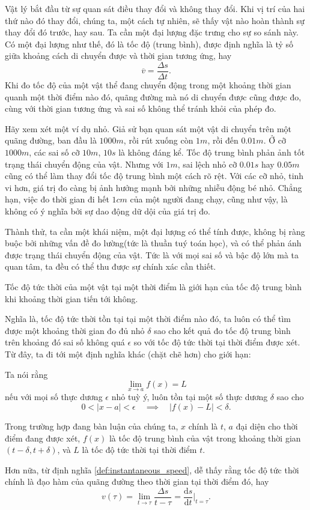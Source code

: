 Vật lý bắt đầu từ sự quan sát điều thay đổi và không thay đổi. Khi vị trí của hai thứ nào đó thay đổi, chúng ta, một cách tự nhiên, sẽ thấy vật nào hoàn thành sự thay đổi đó trước, hay sau. Ta cần một đại lượng đặc trưng cho sự so sánh này. Có một đại lượng như thế, đó là tốc độ (trung bình), được định nghĩa là tỷ số giữa khoảng cách di chuyển được và thời gian tương ứng, hay
\[\overline{v}=\frac{\Delta s}{\Delta t}.\] 
Khi đo tốc độ của một vật thể đang chuyển động trong một khoảng thời gian quanh một thời điểm nào đó, quãng đường mà nó di chuyển được cũng được đo, cùng với thời gian tương ứng và sai số không thể tránh khỏi của phép đo.
\vspace{8pt}

Hãy xem xét một ví dụ nhỏ. Giả sử bạn quan sát một vật di chuyển trên một quãng đường, ban đầu là \(1000m\), rồi rút xuống còn \(1m\), rồi đến \(0.01m\). Ở cỡ \(1000m\), các sai số cỡ \(10m\), \(10s\) là không đáng kể. Tốc độ trung bình phản ảnh tốt trạng thái chuyển động của vật. Nhưng với \(1m\), sai lệch nhỏ cỡ \(0.01s\) hay \(0.05m\) cũng có thể làm thay đổi tốc độ trung bình một cách rõ rệt. Với các cỡ nhỏ, tinh vi hơn, giá trị đo càng bị ảnh hưởng mạnh bởi những nhiễu động bé nhỏ.
Chẳng hạn, việc đo thời gian đi hết \(1cm\) của một người đang chạy, cũng như vậy, là không có ý nghĩa bởi sự dao động dữ dội của giá trị đo.  
\vspace{8pt}

Thành thử, ta cần một khái niệm, một đại lượng có thể tính được, không bị ràng buộc bởi những vấn đề đo lường(tức là thuần tuý toán học), và có thể phản ánh được trạng thái chuyển động của vật. Tức là với mọi sai số và bậc độ lớn mà ta quan tâm, ta đều có thể thu được sự chính xác cần thiết. 
\begin{definition}\label{def:instantaneous_speed}
    Tốc độ tức thời của một vật tại một thời điểm là giới hạn của tốc độ trung bình khi khoảng thời gian tiến tới không.
\end{definition}
Nghĩa là, tốc độ tức thời tồn tại tại một thời điểm nào đó, ta luôn có thể tìm được một khoảng thời gian đo đủ nhỏ \(\delta\) sao cho kết quả đo tốc độ trung bình trên khoảng đó sai số không quá \(\epsilon\) so với tốc độ tức thời tại thời điểm được xét. Từ đây, ta đi tới một định nghĩa khác (chặt chẽ hơn) cho giới hạn:
\begin{definition}
    Ta nói rằng \[\lim_{x\rightarrow a}f(x)=L\] nếu với mọi số thực dương \(\epsilon\) nhỏ tuỳ ý, luôn tồn tại một số thực dương \(\delta\) sao cho 
    \[0<\lvert x-a\rvert <\epsilon \quad\implies \quad \lvert f(x)-L\rvert <\delta.\]
\end{definition}
Trong trường hợp đang bàn luận của chúng ta, \(x\) chính là \(t\), \(a\) đại diện cho thời điểm đang được xét, \(f(x)\) là tốc độ trung bình của vật trong khoảng thời gian \((t-\delta,t+\delta)\), và \(L\) là tốc độ tức thời tại thời điểm \(t\).
\vspace{8pt}

Hơn nữa, từ định nghĩa \ref{def:instantaneous_speed}, dễ thấy rằng tốc độ tức thời chính là đạo hàm của quãng đường theo thời gian tại thời điểm đó, hay 
\[v(\tau)=\lim_{t\rightarrow\tau}\frac{\Delta s}{t-\tau}=\frac{\text{d}s}{\text{d}t}\Big|_{t=\tau}.\]